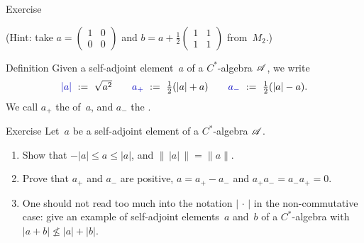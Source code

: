 \documentclass[a]{subfiles}
\begin{document}
\begin{parsec}
\begin{point}[sqrt]{Exercise}
\begin{enumerate}
(Hint: take $a=(\begin{smallmatrix}1&0\\0&0\end{smallmatrix})$
and $b=a+\frac{1}{2}(\begin{smallmatrix}1&1\\1&1\end{smallmatrix})$
from~$M_2$.)
\end{enumerate}
\end{point}
\begin{point}{Definition}
Given a self-adjoint element~$a$ of a $C^*$-algebra $\mathscr{A}$,
we write
\begin{equation*}
\textstyle
\Define{\left|a\right|}\ :=\ \sqrt{a^2}
\qquad
\Define{\pos{a}}\ :=\ \frac{1}{2}(\left|a\right| + a)
\qquad
\Define{a_{-}}\ :=\ \frac{1}{2}(\left|a\right| - a).
\end{equation*}
We call $a_+$ the  of~$a$,
and $a_-$ the .
\end{point}
\begin{point}{Exercise}%
Let~$a$ be a self-adjoint element of a
 $C^*$-algebra $\mathscr{A}$.
\begin{enumerate}
\item
Show that $-\left|a\right| \leq a \leq \left| a \right|$,
and $\|\,\left|a\right|\,\|= \|a\|$.
\item
Prove that $a_+$ and $a_-$ are positive,  $a=a_+-a_-$
and $a_+a_-=a_-a_+=0$.
\item
One should not read too much into the notation
$\left|\,\cdot\,\right|$
in the non-commutative case:
give an example of
self-adjoint elements~$a$ and~$b$ of a $C^*$-algebra with
 $\left|a+b\right|\nleq \left|a\right|+ \left|b\right|$.


\end{enumerate}
\end{point}
\end{parsec}
\end{document}
